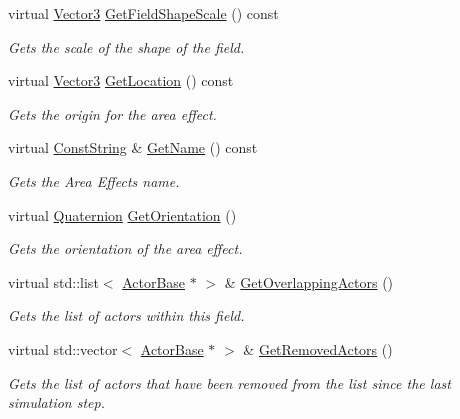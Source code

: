 \begin{DoxyCompactItemize}
virtual \hyperlink{classphys_1_1Vector3}{Vector3} \hyperlink{classphys_1_1AreaEffect_a4157e5e4142cbc3f0908942b4271b9b7}{GetFieldShapeScale} () const 
\begin{DoxyCompactList}\small\item\em Gets the scale of the shape of the field. \item\end{DoxyCompactList}\item 
virtual \hyperlink{classphys_1_1Vector3}{Vector3} \hyperlink{classphys_1_1AreaEffect_ac3ca23ffdcec077d0e7f36a471602b88}{GetLocation} () const 
\begin{DoxyCompactList}\small\item\em Gets the origin for the area effect. \item\end{DoxyCompactList}\item 
virtual \hyperlink{namespacephys_a5ce5049f8b4bf88d6413c47b504ebb31}{ConstString} \& \hyperlink{classphys_1_1AreaEffect_ac61255fb998e6d76ba6678f70796174d}{GetName} () const 
\begin{DoxyCompactList}\small\item\em Gets the Area Effects name. \item\end{DoxyCompactList}\item 
virtual \hyperlink{classphys_1_1Quaternion}{Quaternion} \hyperlink{classphys_1_1AreaEffect_a48946a43238686044cb4101a218102d6}{GetOrientation} ()
\begin{DoxyCompactList}\small\item\em Gets the orientation of the area effect. \item\end{DoxyCompactList}\item 
virtual std::list$<$ \hyperlink{classphys_1_1ActorBase}{ActorBase} $\ast$ $>$ \& \hyperlink{classphys_1_1AreaEffect_ab995fec11d9e5fbae1851109067958db}{GetOverlappingActors} ()
\begin{DoxyCompactList}\small\item\em Gets the list of actors within this field. \item\end{DoxyCompactList}\item 
virtual std::vector$<$ \hyperlink{classphys_1_1ActorBase}{ActorBase} $\ast$ $>$ \& \hyperlink{classphys_1_1AreaEffect_a021763db69e977a3a19ad7cc39df073b}{GetRemovedActors} ()
\begin{DoxyCompactList}\small\item\em Gets the list of actors that have been removed from the list since the last simulation step. \item\end{DoxyCompactList}\item 

\end{DoxyCompactItemize}
